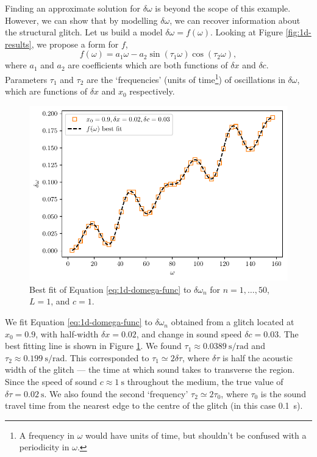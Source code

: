Finding an approximate solution for \(\delta\omega\) is beyond the scope of this example. However, we can show that by modelling \(\delta\omega\), we can recover information about the structural glitch. Let us build a model \(\delta\omega = f(\omega)\). Looking at Figure \ref{fig:1d-results}, we propose a form for \(f\),
%
\begin{equation}
    f(\omega) = a_1 \omega - a_2 \sin (\tau_1 \omega) \cos (\tau_2 \omega), \label{eq:1d-domega-func}
\end{equation}
%
where \(a_1\) and \(a_2\) are coefficients which are both functions of \(\delta x\) and \(\delta c\). Parameters \(\tau_1\) and \(\tau_2\) are the `frequencies' (units of time\footnote{A frequency in \(\omega\) would have units of time, but shouldn't be confused with a periodicity in \(\omega\).}) of oscillations in \(\delta\omega\), which are functions of \(\delta x\) and \(x_0\) respectively.

\begin{figure}[!tb]
    \centering
    \includegraphics{figures/glitch-1d-fit.pdf}
    \caption{Best fit of Equation \ref{eq:1d-domega-func} to \(\delta\omega_n\) for \(n=1,\dots,50\), \(L=1\), and \(c=1\).}
    \label{fig:1d-fit}
\end{figure}

We fit Equation \ref{eq:1d-domega-func} to \(\delta\omega_n\) obtained from a glitch located at \(x_0 = 0.9\), with half-width \(\delta x = 0.02\), and change in sound speed \(\delta c = 0.03\). The best fitting line is shown in Figure \ref{fig:1d-fit}. We found \(\tau_1 \approx \SI{0.0389}{\second\per\radian}\) and \(\tau_2 \approx \SI{0.199}{\second\per\radian}\). This corresponded to \(\tau_1 \simeq 2\delta\tau\), where \(\delta\tau\) is half the acoustic width of the glitch --- the time at which sound takes to transverse the region. Since the speed of sound \(c \approx \SI{1}{\second}\) throughout the medium, the true value of \(\delta\tau = \SI{0.02}{\second}\). We also found the second `frequency' \(\tau_2 \simeq 2\tau_0\), where \(\tau_0\) is the sound travel time from the nearest edge to the centre of the glitch (in this case \SI{0.1}{\second}).

